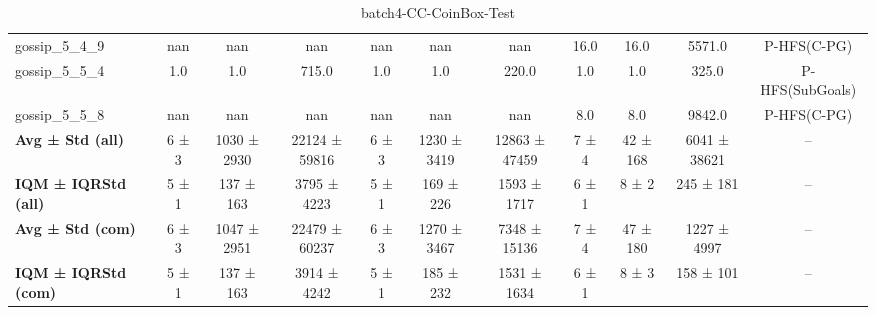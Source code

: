 \begin{table}[!ht]
\begin{tabular}{l|ccc|ccc|cccc}
gossip\_5\_4\_9 & nan & nan & nan & nan & nan & nan & 16.0 & 16.0 & 5571.0 & P-HFS(C-PG) \\
gossip\_5\_5\_4 & 1.0 & 1.0 & 715.0 & 1.0 & 1.0 & 220.0 & 1.0 & 1.0 & 325.0 & P-HFS(SubGoals) \\
gossip\_5\_5\_8 & nan & nan & nan & nan & nan & nan & 8.0 & 8.0 & 9842.0 & P-HFS(C-PG) \\
\hline
\textbf{Avg ± Std (all)} & 6 ± 3 & 1030 ± 2930 & 22124 ± 59816 & 6 ± 3 & 1230 ± 3419 & 12863 ± 47459 & 7 ± 4 & 42 ± 168 & 6041 ± 38621 & -- \\
\textbf{IQM ± IQRStd (all)} & 5 ± 1 & 137 ± 163 & 3795 ± 4223 & 5 ± 1 & 169 ± 226 & 1593 ± 1717 & 6 ± 1 & 8 ± 2 & 245 ± 181 & -- \\
\textbf{Avg ± Std (com)} & 6 ± 3 & 1047 ± 2951 & 22479 ± 60237 & 6 ± 3 & 1270 ± 3467 & 7348 ± 15136 & 7 ± 4 & 47 ± 180 & 1227 ± 4997 & -- \\
\textbf{IQM ± IQRStd (com)} & 5 ± 1 & 137 ± 163 & 3914 ± 4242 & 5 ± 1 & 185 ± 232 & 1531 ± 1634 & 6 ± 1 & 8 ± 3 & 158 ± 101 & -- \\
\end{tabular}
\caption{batch4-CC-CoinBox-Test}
\label{tab:batch4_CC-CoinBox_comparison_test}
\end{table}

